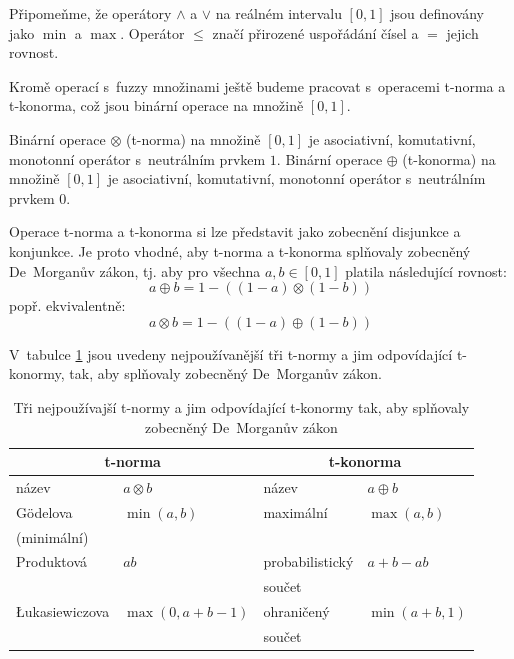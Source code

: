 Připomeňme, že operátory $\wedge$ a $\vee$ na reálném intervalu $[0, 1]$ jsou definovány jako $\min$ a $\max$. Operátor $\le$ značí přirozené uspořádání čísel a $=$ jejich rovnost.

Kromě operací s~fuzzy množinami ještě budeme pracovat s~operacemi t-norma a t-konorma, což jsou binární operace na množině $[0,1]$.
\begin{definition}
 Binární operace $\otimes$ (t-norma) na množině $[0,1]$ je asociativní, komutativní, monotonní operátor s~neutrálním prvkem $1$.
 Binární operace $\oplus$  (t-konorma) na množině $[0,1]$ je asociativní, komutativní, monotonní operátor s~neutrálním prvkem $0$.
\end{definition}

Operace t-norma a t-konorma si lze představit jako zobecnění disjunkce a konjunkce. Je proto vhodné, aby t-norma a t-konorma splňovaly zobecněný De~Morganův zákon, tj. aby pro všechna $a, b \in [0,1]$ platila následující rovnost:
$$
  a \oplus b = 1 - ((1 - a) \otimes (1 - b))
$$
popř. ekvivalentně:
$$
  a \otimes b = 1 - ((1 - a) \oplus (1 - b))
$$

V~tabulce \ref{tbl:Norms} jsou uvedeny nejpoužívanější tři t-normy a jim odpovídající t-konormy, tak, aby splňovaly zobecněný De~Morganův zákon.
\begin{table}
 \centering
 \begin{tabular}{|l|l||l|l|}
  \hline
  \multicolumn{2}{|c||}{t-norma}			& \multicolumn{2}{|c|}{t-konorma}			\\\hline 
  název	 		& $a \otimes b$		& název				& $a \oplus b$		\\\hline \hline
  Gödelova 		& $\min(a, b)$ 		& maximální 			& $\max(a, b)$		\\
  (minimální) 		&			&				&			\\\hline
  Produktová 		& $a b$ 		& probabilistický  		& $a + b - a b$		\\
			&			& součet			&			\\\hline
  \L{}ukasiewiczova 	& $\max(0, a + b - 1)$ 	& ohraničený 			& $\min(a + b, 1)$	\\
			&			& součet			&			\\\hline
 \end{tabular}

 \caption[Tři nejpoužívajší t-normy]{Tři nejpoužívajší t-normy a jim odpovídající t-konormy tak, aby splňovaly zobecněný De~Morganův zákon}
 \label{tbl:Norms}
\end{table}

